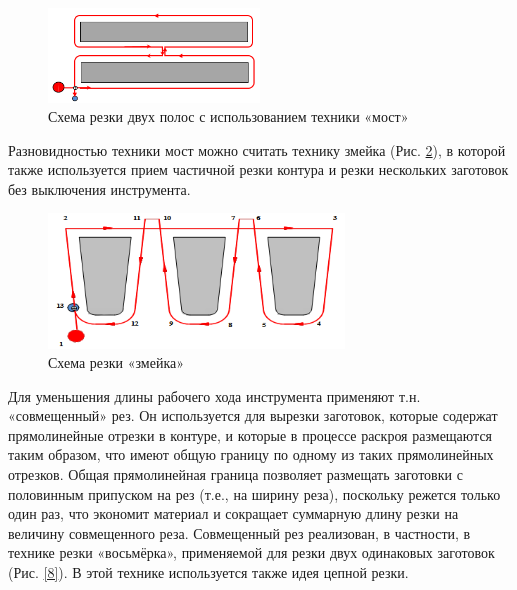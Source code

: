 \documentclass[12pt]{report}
\begin{document}
\begin{figure}
  \begin{center}
  \includegraphics[width=0.5\textwidth]{bridge.png}
  \caption{Схема резки двух полос с использованием техники «мост»}
  \label{bridge}
  \end{center}
\end{figure}

Разновидностью техники мост можно считать технику змейка
(Рис. \ref{snake}),
в которой также используется прием
частичной резки контура и резки
нескольких заготовок без выключения инструмента.

\begin{figure}
  \begin{center}
  \includegraphics[width=0.7\textwidth]{snake.png}
  \caption{Схема резки «змейка»}
  \label{snake}
  \end{center}
\end{figure}

Для уменьшения длины рабочего хода инструмента
применяют т.н. «совмещенный» рез.
Он используется для вырезки заготовок,
которые содержат прямолинейные отрезки в контуре,
и которые в процессе раскроя размещаются таким образом,
что имеют общую границу по одному из таких прямолинейных отрезков.
Общая прямолинейная граница позволяет размещать
заготовки с половинным припуском на рез
(т.е., на ширину реза),
поскольку режется только один раз,
что экономит материал и сокращает суммарную
длину резки на величину совмещенного реза.
Совмещенный рез реализован, в частности,
в технике резки «восьмёрка»,
применяемой для резки двух одинаковых заготовок
(Рис. \ref{8}).
В этой технике используется также идея цепной резки.
\end{document}
